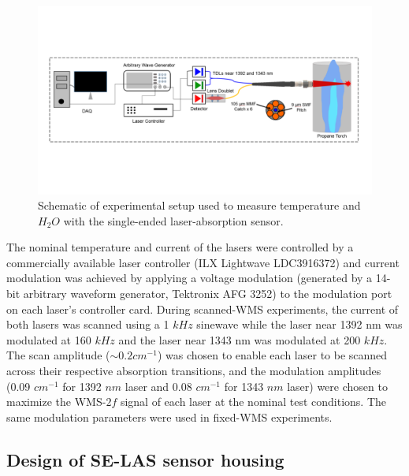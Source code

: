  \begin{figure}[ht]
    \centering
        \includegraphics[trim = 0mm 52mm 0mm 20mm, clip=true, width=1\textwidth]{fig/ch4_fig1.pdf}
        \caption{Schematic of experimental setup used to measure temperature and $H_2O$ with the single-ended laser-absorption sensor.}
    \label{fig:ch4_3}
\end{figure}

The nominal temperature and current of the lasers were controlled by a commercially available laser controller (ILX Lightwave LDC3916372) and current modulation was achieved by applying a voltage modulation (generated by a 14-bit arbitrary waveform generator, Tektronix AFG 3252) to the modulation port on each laser’s controller card. During scanned-WMS experiments, the current of both lasers was scanned using a 1 $kHz$ sinewave while the laser near 1392 nm was modulated at 160 $kHz$ and the laser near 1343 nm was modulated at 200 $kHz$. The scan amplitude ($\sim 0.2 cm^{-1}$) was chosen to enable each laser to be scanned across their respective absorption transitions, and the modulation amplitudes (0.09 $cm^{-1}$ for 1392 $nm$ laser and 0.08 $cm^{-1}$ for 1343 $nm$ laser) were chosen to maximize the WMS-$2f$ signal of each laser at the nominal test conditions. The same modulation parameters were used in fixed-WMS experiments.


\subsection{Design of SE-LAS sensor housing}

